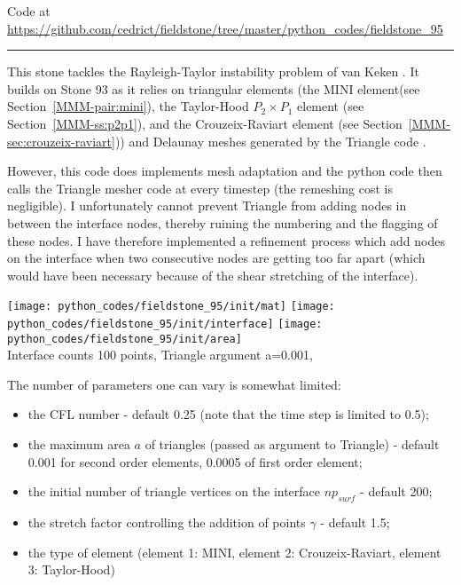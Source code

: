

\begin{center}
Code at \url{https://github.com/cedrict/fieldstone/tree/master/python_codes/fieldstone_95}
\end{center}

\par\noindent\rule{\textwidth}{0.4pt}


This stone tackles the Rayleigh-Taylor instability problem of van Keken \etal \cite{vaks97}. 
It builds on Stone 93 as it relies on triangular elements (the MINI 
element(see Section~\ref{MMM-pair:mini}), 
the Taylor-Hood $P_2\times P_1$ element (see Section~\ref{MMM-ss:p2p1}), 
and the Crouzeix-Raviart element (see Section~\ref{MMM-sec:crouzeix-raviart})) and Delaunay meshes
generated by the Triangle code \cite{shew14}.  

However, this code does implements mesh adaptation and the python code then calls the Triangle mesher code
at every timestep (the remeshing cost is negligible).
I unfortunately cannot prevent Triangle from adding nodes in between the interface nodes, thereby 
ruining the numbering and the flagging of these nodes. I have therefore implemented a refinement 
process which add nodes on the interface when two consecutive nodes are getting too far apart (which 
would have been necessary because of the shear stretching of the interface). 

\begin{center}
\texttt{[image: python\_codes/fieldstone\_95/init/mat]}
\texttt{[image: python\_codes/fieldstone\_95/init/interface]}
\texttt{[image: python\_codes/fieldstone\_95/init/area]}\\
{\captionfont Interface counts 100 points, Triangle argument a=0.001, } 
\end{center}

The number of parameters one can vary is somewhat limited:
\begin{itemize}
\item the CFL number - default 0.25 (note that the time step is limited to 0.5);
\item the maximum area $a$ of triangles (passed as argument to Triangle) - default 0.001 for second order elements,
0.0005 of first order element;
\item the initial number of triangle vertices on the interface $np_{surf}$ - default 200;
\item the stretch factor controlling the addition of points $\gamma$ - default 1.5;
\item the type of element (element 1: MINI, element 2: Crouzeix-Raviart, element 3: Taylor-Hood)  
\end{itemize}

